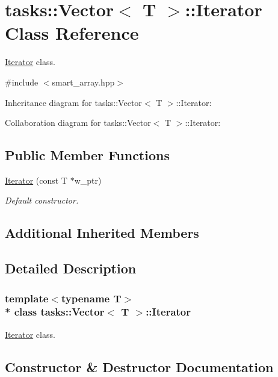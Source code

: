 \hypertarget{classtasks_1_1Vector_1_1Iterator}{}\section{tasks\+:\+:Vector$<$ T $>$\+:\+:Iterator Class Reference}
\label{classtasks_1_1Vector_1_1Iterator}


\hyperlink{classtasks_1_1Vector_1_1Iterator}{Iterator} class.  




{\ttfamily \#include $<$smart\+\_\+array.\+hpp$>$}



Inheritance diagram for tasks\+:\+:Vector$<$ T $>$\+:\+:Iterator\+:


Collaboration diagram for tasks\+:\+:Vector$<$ T $>$\+:\+:Iterator\+:
\subsection*{Public Member Functions}
\begin{DoxyCompactItemize}
\item 
\hyperlink{classtasks_1_1Vector_1_1Iterator_abade6773210fc703a4b8e1f4e6db505b}{Iterator} (const T $\ast$w\+\_\+ptr)
\begin{DoxyCompactList}\small\item\em Default constructor. \end{DoxyCompactList}\end{DoxyCompactItemize}
\subsection*{Additional Inherited Members}


\subsection{Detailed Description}
\subsubsection*{template$<$typename T$>$\\*
class tasks\+::\+Vector$<$ T $>$\+::\+Iterator}

\hyperlink{classtasks_1_1Vector_1_1Iterator}{Iterator} class. 

\subsection{Constructor \& Destructor Documentation}
